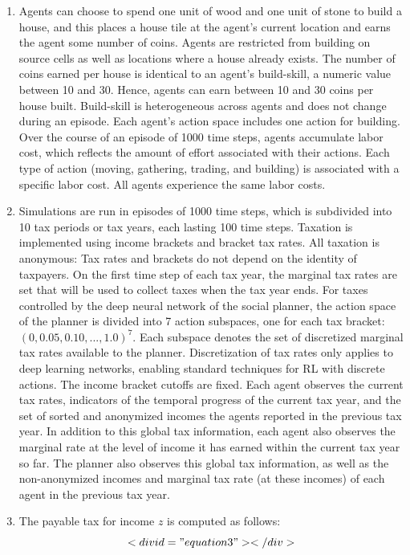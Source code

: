 \documentclass{article}
\begin{document}
\begin{enumerate}
\item Agents can choose to spend one unit of wood and one unit of stone to build a house, and this places a house tile at the agent’s current location and earns the agent some number of coins. Agents are restricted from building on source cells as well as locations where a house already exists. The number of coins earned per house is identical to an agent’s build-skill, a numeric value between 10 and 30. Hence, agents can earn between 10 and 30 coins per house built. Build-skill is heterogeneous across agents and does not change during an episode. Each agent’s action space includes one action for building. Over the course of an episode of 1000 time steps, agents accumulate labor cost, which reflects the amount of effort associated with their actions. Each type of action (moving, gathering, trading, and building) is associated with a specific labor cost. All agents experience the same labor costs.

\item Simulations are run in episodes of 1000 time steps, which is subdivided into 10 tax periods or tax years, each lasting 100 time steps. Taxation is implemented using income brackets and bracket tax rates. All taxation is anonymous: Tax rates and brackets do not depend on the identity of taxpayers. On the first time step of each tax year, the marginal tax rates are set that will be used to collect taxes when the tax year ends. For taxes controlled by the deep neural network of the social planner, the action space of the planner is divided into 7 action subspaces, one for each tax bracket: \( (0, 0.05, 0.10, ..., 1.0)^{7} \). Each subspace denotes the set of discretized marginal tax rates available to the planner. Discretization of tax rates only applies to deep learning networks, enabling standard techniques for RL with discrete actions. The income bracket cutoffs are fixed. Each agent observes the current tax rates, indicators of the temporal progress of the current tax year, and the set of sorted and anonymized incomes the agents reported in the previous tax year. In addition to this global tax information, each agent also observes the marginal rate at the level of income it has earned within the current tax year so far. The planner also observes this global tax information, as well as the non-anonymized incomes and marginal tax rate (at these incomes) of each agent in the previous tax year.

\item The payable tax for income \( z \) is computed as follows:
\begin{equation}<div id="equation3"></div>


\end{equation}
\end{enumerate}
\end{document}
